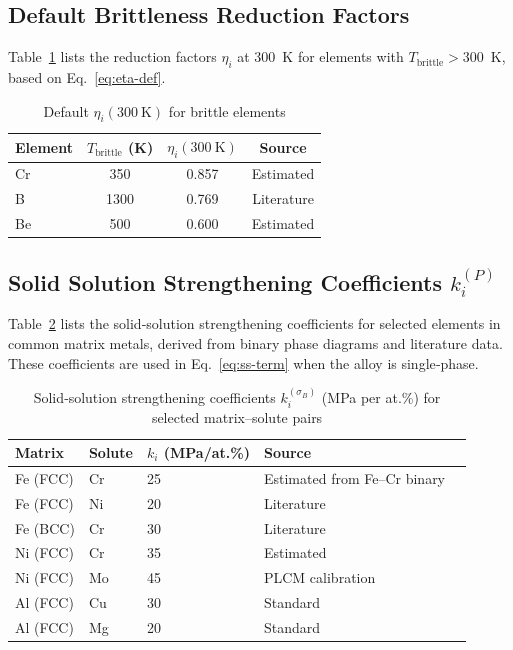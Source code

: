 \documentclass[12pt,a4paper]{article}
\begin{document}
	\subsection{Default Brittleness Reduction Factors}
	\label{subsec:eta-table}
	Table~\ref{tab:eta} lists the reduction factors $\eta_i$ at 300~K for elements with $T_{\text{brittle}} > 300$~K, based on Eq.~\ref{eq:eta-def}.
	\begin{table}[htbp]
		\centering
		\caption{Default $\eta_i(300\ \mathrm{K})$ for brittle elements}
		\label{tab:eta}
		\begin{tabular}{lccc}
			\toprule
			\textbf{Element} & $T_{\text{brittle}}$ (K) & $\eta_i(300\ \mathrm{K})$ & \textbf{Source} \\
			\midrule
			Cr & 350 & 0.857 & Estimated \\
			B  & 1300 & 0.769 & Literature \\
			Be & 500 & 0.600 & Estimated \\
			\bottomrule
		\end{tabular}
	\end{table}
	
	\subsection{Solid Solution Strengthening Coefficients $k_i^{(P)}$}
	\label{subsec:kss}
	
	Table~\ref{tab:kss} lists the solid‑solution strengthening coefficients for selected elements in common matrix metals, derived from binary phase diagrams and literature data. These coefficients are used in Eq.~\ref{eq:ss-term} when the alloy is single‑phase.
	
	\begin{longtable}{p{2cm} p{2cm} p{2cm} p{2cm} p{2cm}}
		\caption{Solid‑solution strengthening coefficients $k_i^{(\sigma_B)}$ (MPa per at.\%) for selected matrix–solute pairs}\label{tab:kss}\\
		\toprule
		\textbf{Matrix} & \textbf{Solute} & $k_i$ (MPa/at.\%) & \textbf{Source} \\
		\midrule
		Fe (FCC) & Cr & 25 & Estimated from Fe–Cr binary \\
		Fe (FCC) & Ni & 20 & Literature \\
		Fe (BCC) & Cr & 30 & Literature \\
		Ni (FCC) & Cr & 35 & Estimated \\
		Ni (FCC) & Mo & 45 & PLCM calibration \\
		Al (FCC) & Cu & 30 & Standard \\
		Al (FCC) & Mg & 20 & Standard \\
		\bottomrule
	\end{longtable}
	
\end{document}
